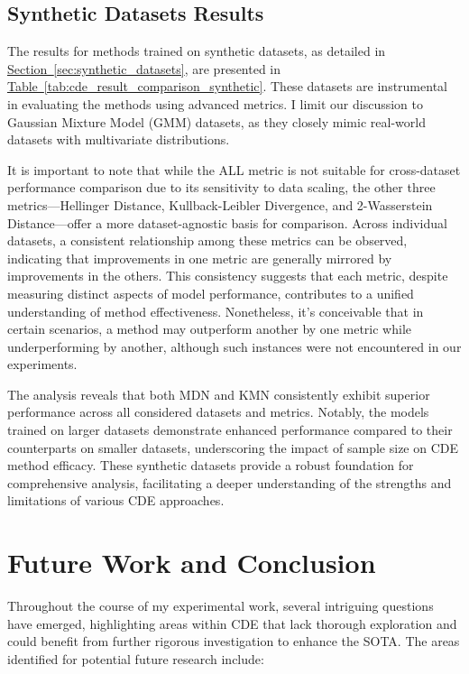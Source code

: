 \documentclass{article}
\newcommand\pef[1]{\hyperref[#1]{Section~\ref{#1}}}
\newcommand\tef[1]{\hyperref[#1]{Table~\ref{#1}}}
\begin{document}
\subsection{Synthetic Datasets Results}

The results for methods trained on synthetic datasets, as detailed in \pef{sec:synthetic_datasets}, are presented in \tef{tab:cde_result_comparison_synthetic}. These datasets are instrumental in evaluating the methods using advanced metrics. I limit our discussion to Gaussian Mixture Model (GMM) datasets, as they closely mimic real-world datasets with multivariate distributions.

It is important to note that while the ALL metric is not suitable for cross-dataset performance comparison due to its sensitivity to data scaling, the other three metrics—Hellinger Distance, Kullback-Leibler Divergence, and 2-Wasserstein Distance—offer a more dataset-agnostic basis for comparison. Across individual datasets, a consistent relationship among these metrics can be observed, indicating that improvements in one metric are generally mirrored by improvements in the others. This consistency suggests that each metric, despite measuring distinct aspects of model performance, contributes to a unified understanding of method effectiveness. Nonetheless, it's conceivable that in certain scenarios, a method may outperform another by one metric while underperforming by another, although such instances were not encountered in our experiments.

The analysis reveals that both MDN and KMN consistently exhibit superior performance across all considered datasets and metrics. Notably, the models trained on larger datasets demonstrate enhanced performance compared to their counterparts on smaller datasets, underscoring the impact of sample size on CDE method efficacy. These synthetic datasets provide a robust foundation for comprehensive analysis, facilitating a deeper understanding of the strengths and limitations of various CDE approaches.

\section{Future Work and Conclusion}\label{sec:future_work_and_conclusion}
Throughout the course of my experimental work, several intriguing questions have emerged, highlighting areas within CDE that lack thorough exploration and could benefit from further rigorous investigation to enhance the SOTA. The areas identified for potential future research include:
\end{document}
